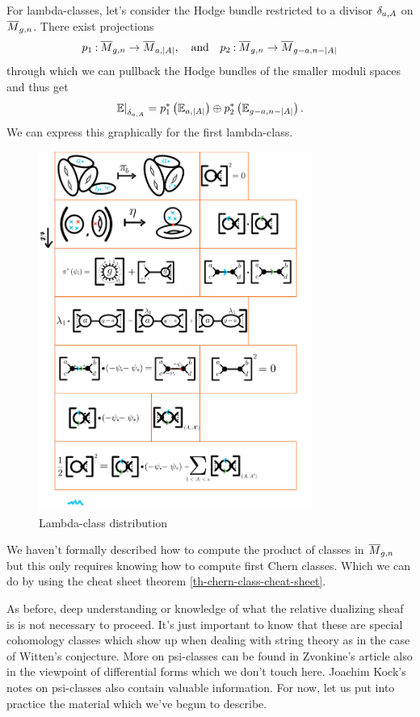 \documentclass[12pt]{memoir}
\begin{document}
\begin{Ex}%
    For lambda-classes, let's consider the Hodge bundle restricted to a divisor $\delta_{a,A}$ on $\overline M_{g,n}$. There exist projections 
    $$p_1\mathbin{:}\overline{M}_{g,n}\to\overline{M}_{a,|A|},\quad\text{and}\quad p_2\mathbin{:}\overline{M}_{g,n}\to\overline{M}_{g-a,n-|A|}$$
    through which we can pullback the Hodge bundles of the smaller moduli spaces and thus get 
    $$\left.\mathbb{E}\right|_{\delta_{a,A}}=p_1^\ast\left(\mathbb{E}_{a,|A|}\right)\oplus p_2^\ast\left(\mathbb{E}_{g-a,n-|A|}\right).$$
    We can express this graphically for the first lambda-class.
     \begin{figure}[h!]
        \centering
        \includegraphics[width=0.8\textwidth, trim= 1.3cm 13.5cm 5.1cm 11.8cm,clip]{../figs/FigsDNnotability2.pdf}
        \caption{Lambda-class distribution}
        \label{fig:lambda-class-distribution}
    \end{figure}

    We haven't formally described how to compute the product of classes in $\overline M_{g,n}$ but this only requires knowing how to compute first Chern classes. Which we can do by using the cheat sheet theorem \ref{th-chern-class-cheat-sheet}.
\end{Ex}
As before, deep understanding or knowledge of what the relative dualizing sheaf is is not necessary to proceed. It's just important to know that these are special cohomology classes which show up when dealing with string theory as in the case of Witten's conjecture. More on psi-classes can be found in Zvonkine's article \cite{ZvonkineIntro} also in the viewpoint of differential forms which we don't touch here. Joachim Kock's notes on psi-classes \cite{KockPsiClasses} also contain valuable information. For now, let us put into practice the material which we've begun to describe. 
\end{document}
